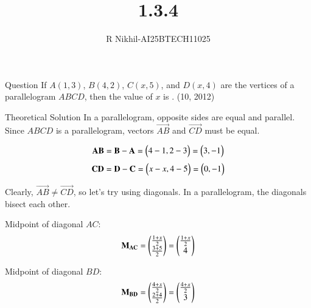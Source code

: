 \documentclass{beamer}
\title %
{1.3.4}
\author %
{R Nikhil-AI25BTECH11025}
\begin{document}
\frame{\titlepage}
\begin{frame}{Question}
If $ A(1, 3) $, $ B(4, 2) $, $ C(x, 5) $, and $ D(x, 4) $ are the vertices of a parallelogram $ABCD$, then the value of $x$ is \underline{\hspace{2cm}}. \hfill (10, 2012)
\end{frame}

\begin{frame}{Theoretical Solution}
In a parallelogram, opposite sides are equal and parallel. Since $ABCD$ is a parallelogram, vectors $ \vec{AB} $ and $ \vec{CD} $ must be equal.

\begin{align}
\mathbf{AB} = \mathbf{B} -\mathbf{A} = \begin{pmatrix}4 - 1, 2 - 3\end{pmatrix} = \begin{pmatrix}3, -1\end{pmatrix}
\end{align}
\begin{align}
\mathbf{CD} = \mathbf{D} - \mathbf{C} = \begin{pmatrix}x - x, 4 - 5\end{pmatrix} = \begin{pmatrix}0, -1\end{pmatrix}
\end{align}

Clearly, $ \vec{AB} \neq \vec{CD} $, so let's try using diagonals. In a parallelogram, the diagonals bisect each other.

Midpoint of diagonal $AC$:
\begin{align}
\Vec{M_{AC}} = \myvec{\frac{1 + x}{2} \\ \frac{3 + 5}{2} } = \myvec{ \frac{1 + x}{2}\\ 4 }
\end{align}

Midpoint of diagonal $BD$:
\begin{align}
\mathbf{M_{BD}} = \begin{pmatrix}\frac{4 + x}{2} \\ \frac{2 + 4}{2} \end{pmatrix} = \begin{pmatrix} \frac{4 + x}{2}\\ 3 \end{pmatrix}
\end{align}
\end{frame}
\end{document}
